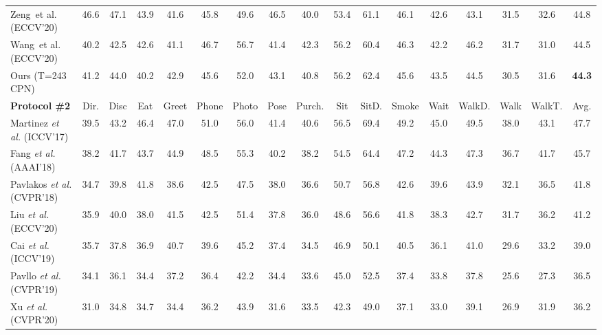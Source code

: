 \documentclass[10pt,twocolumn,letterpaper]{article}
\begin{document}
\begin{table*}[t]
{\begin{tabular}{@{}l|ccccccccccccccc|c@{}}
Zeng~et al. (ECCV'20) \cite{zeng2020srnet}& 46.6& 47.1& 43.9& 41.6& 45.8& 49.6& 46.5& 40.0& 53.4& 61.1& 46.1& 42.6& 43.1& 31.5& 32.6& 44.8 \\

Wang~et al. (ECCV'20) \cite{wang2020motion} &40.2 &42.5 &42.6 &41.1 &46.7 &56.7 &41.4 &42.3 &56.2 &60.4 &46.3 &42.2 &46.2 &31.7 &31.0 &44.5 \\
         
			\midrule[0.5pt]
         Ours (T=243 CPN) &41.2 &{44.0} &{40.2} &{42.9} &{45.6} &{52.0} &43.1 &{40.8} &{56.2} &62.4 &{45.6} &{43.5} &{44.5} &{30.5} &31.6 &\textbf{44.3} \\
         
         \toprule[1pt]
         \textbf{Protocol \#2} & Dir. & Disc & Eat & Greet & Phone & Photo & Pose & Purch. & Sit & SitD. & Smoke & Wait & WalkD. & Walk & WalkT. & Avg.\\
			\midrule[0.5pt]

         Martinez \emph{et al.} (ICCV'17) \cite{martinez2017simple} &39.5 &43.2 &46.4 &47.0 &51.0 &56.0 &41.4 &40.6 &56.5 &69.4 &49.2 &45.0 &49.5 &38.0 &43.1 &47.7\\

         Fang \emph{et al.} (AAAI'18) \cite{fang2018learning} &38.2 &41.7 &43.7 &44.9 &48.5 &55.3 &40.2 &38.2 &54.5 &64.4 &47.2 &44.3 &47.3 &36.7 &41.7 &45.7 \\

         Pavlakos \emph{et al.} (CVPR'18) \cite{pavlakos2018ordinal}&34.7 &39.8 &41.8 &38.6 &42.5 &47.5 &38.0 &36.6 &50.7 &56.8 &42.6 &39.6 &43.9 &32.1 &36.5 &41.8 \\

			Liu \emph{et al.} (ECCV'20) \cite{liu2020comprehensive}&35.9 &40.0 &38.0 &41.5 &42.5 &51.4 &37.8 &36.0 &48.6 &56.6 &41.8 &38.3 &42.7 &31.7 &36.2 &41.2 \\

         Cai \emph{et al.} (ICCV'19) \cite{cai2019exploiting}&35.7 &37.8 &36.9 &40.7 &39.6 &45.2 &37.4 &34.5 &46.9 &{50.1} &40.5 &36.1 &41.0 &29.6 &33.2 &39.0 \\

         Pavllo \emph{et al.} (CVPR'19) \cite{pavllo20193d} &34.1 &36.1 &{34.4} &37.2 &36.4 &{42.2} &{34.4} &33.6 &45.0 &52.5 &37.4 &{33.8} &{37.8} &{25.6} &{27.3} &36.5\\

         Xu \emph{et al.} (CVPR'20) \cite{xu2020deep}&31.0 &34.8 &34.7 &34.4 &36.2 &43.9 &31.6 &33.5 &42.3 &49.0 &37.1 &33.0 &39.1 &26.9 &31.9 &36.2 \\


\end{tabular}}
\end{table*}
\end{document}
